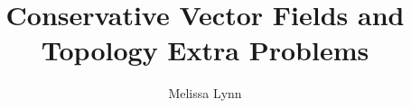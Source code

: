 \documentclass{ximera}
\title{Conservative Vector Fields and Topology Extra Problems}
\author{Melissa Lynn}
\begin{document}
  
\begin{abstract}  
\end{abstract}  
\maketitle
\end{document}
